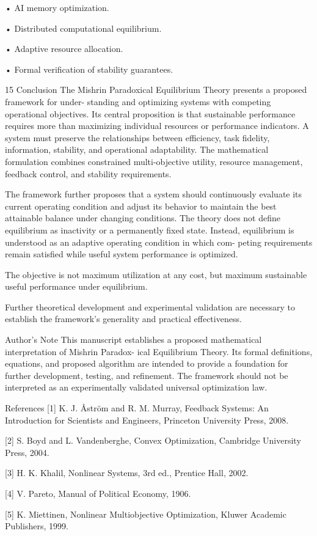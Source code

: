 \documentclass[10pt,a4paper]{article}
\begin{document}
\begin{ManuscriptText}
  • AI memory optimization.

  • Distributed computational equilibrium.

  • Adaptive resource allocation.

  • Formal verification of stability guarantees.


15     Conclusion
The Mishrin Paradoxical Equilibrium Theory presents a proposed framework for under-
standing and optimizing systems with competing operational objectives.
   Its central proposition is that sustainable performance requires more than maximizing
individual resources or performance indicators.
   A system must preserve the relationships between efficiency, task fidelity, information,
stability, and operational adaptability.
   The mathematical formulation combines constrained multi-objective utility, resource
management, feedback control, and stability requirements.


   The framework further proposes that a system should continuously evaluate its current
operating condition and adjust its behavior to maintain the best attainable balance under
changing conditions.
   The theory does not define equilibrium as inactivity or a permanently fixed state.
   Instead, equilibrium is understood as an adaptive operating condition in which com-
peting requirements remain satisfied while useful system performance is optimized.

     The objective is not maximum utilization at any cost, but maximum
             sustainable useful performance under equilibrium.

   Further theoretical development and experimental validation are necessary to establish
the framework’s generality and practical effectiveness.


Author’s Note
This manuscript establishes a proposed mathematical interpretation of Mishrin Paradox-
ical Equilibrium Theory.
    Its formal definitions, equations, and proposed algorithm are intended to provide a
foundation for further development, testing, and refinement.
    The framework should not be interpreted as an experimentally validated universal
optimization law.


References
 [1] K. J. Åström and R. M. Murray, Feedback Systems: An Introduction for Scientists
     and Engineers, Princeton University Press, 2008.

 [2] S. Boyd and L. Vandenberghe, Convex Optimization, Cambridge University Press,
     2004.

 [3] H. K. Khalil, Nonlinear Systems, 3rd ed., Prentice Hall, 2002.

 [4] V. Pareto, Manual of Political Economy, 1906.

 [5] K. Miettinen, Nonlinear Multiobjective Optimization, Kluwer Academic Publishers,
     1999.
\end{ManuscriptText}
\clearpage
\end{document}

